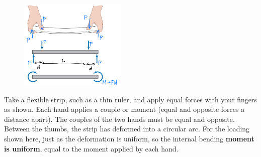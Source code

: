 \begin{figure}[!h]
\centering
\includegraphics[angle=0, width=2in]{Bending-Figures/PureBending.png}
\vspace{-2mm}
\caption{\small {}}
\vspace{-3mm}
\label{Fig:PureBending}
\end{figure}

Take a flexible strip, such as a thin ruler, and apply equal forces with your fingers as shown. Each hand applies a couple or moment (equal and opposite forces a distance apart). The couples of the two hands must be equal and opposite. Between the thumbs, the strip has deformed into a circular arc. For the loading shown here, just as the deformation is uniform, so the internal bending \textbf{moment is uniform}, equal to the moment applied by each hand.

\subsection{}

\textbf{}

\subsection{}

